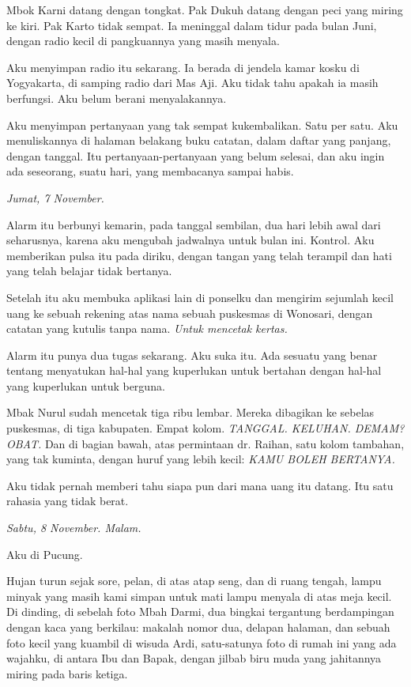 \documentclass[11pt,twoside,openany]{book}
\makeatletter
\newcommand{\scenebreak}{\par\vspace{0.9em}{\centering\textsc{*\hspace{0.7em}*\hspace{0.7em}*}\par}\vspace{0.9em}\@afterindentfalse\@afterheading}
\makeatother
\begin{document}
Mbok Karni datang dengan tongkat. Pak Dukuh datang dengan peci yang miring ke kiri. Pak Karto tidak sempat. Ia meninggal dalam tidur pada bulan Juni, dengan radio kecil di pangkuannya yang masih menyala.

Aku menyimpan radio itu sekarang. Ia berada di jendela kamar kosku di Yogyakarta, di samping radio dari Mas Aji. Aku tidak tahu apakah ia masih berfungsi. Aku belum berani menyalakannya.

Aku menyimpan pertanyaan yang tak sempat kukembalikan. Satu per satu. Aku menuliskannya di halaman belakang buku catatan, dalam daftar yang panjang, dengan tanggal. Itu pertanyaan-pertanyaan yang belum selesai, dan aku ingin ada seseorang, suatu hari, yang membacanya sampai habis.

\scenebreak
\emph{Jumat, 7 November.}

Alarm itu berbunyi kemarin, pada tanggal sembilan, dua hari lebih awal dari seharusnya, karena aku mengubah jadwalnya untuk bulan ini. Kontrol. Aku memberikan pulsa itu pada diriku, dengan tangan yang telah terampil dan hati yang telah belajar tidak bertanya.

Setelah itu aku membuka aplikasi lain di ponselku dan mengirim sejumlah kecil uang ke sebuah rekening atas nama sebuah puskesmas di Wonosari, dengan catatan yang kutulis tanpa nama. \emph{Untuk mencetak kertas.}

Alarm itu punya dua tugas sekarang. Aku suka itu. Ada sesuatu yang benar tentang menyatukan hal-hal yang kuperlukan untuk bertahan dengan hal-hal yang kuperlukan untuk berguna.

Mbak Nurul sudah mencetak tiga ribu lembar. Mereka dibagikan ke sebelas puskesmas, di tiga kabupaten. Empat kolom. \emph{TANGGAL. KELUHAN. DEMAM? OBAT.} Dan di bagian bawah, atas permintaan dr. Raihan, satu kolom tambahan, yang tak kuminta, dengan huruf yang lebih kecil: \emph{KAMU BOLEH BERTANYA.}

Aku tidak pernah memberi tahu siapa pun dari mana uang itu datang. Itu satu rahasia yang tidak berat.

\scenebreak
\emph{Sabtu, 8 November. Malam.}

Aku di Pucung.

Hujan turun sejak sore, pelan, di atas atap seng, dan di ruang tengah, lampu minyak yang masih kami simpan untuk mati lampu menyala di atas meja kecil. Di dinding, di sebelah foto Mbah Darmi, dua bingkai tergantung berdampingan dengan kaca yang berkilau: makalah nomor dua, delapan halaman, dan sebuah foto kecil yang kuambil di wisuda Ardi, satu-satunya foto di rumah ini yang ada wajahku, di antara Ibu dan Bapak, dengan jilbab biru muda yang jahitannya miring pada baris ketiga.
\end{document}
